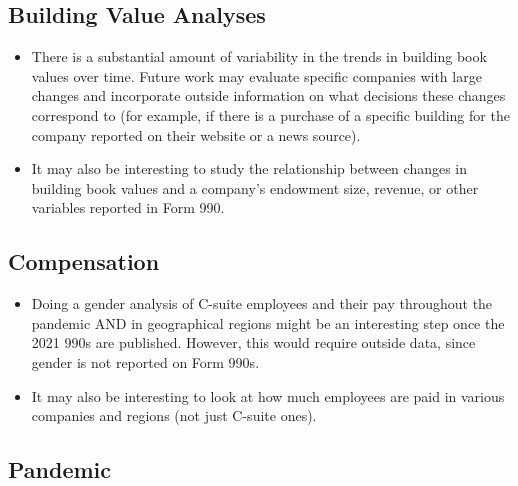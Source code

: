 \documentclass[Dance Data
Project,article,submit,moreauthors,pdftex]{mdpi}
\providecommand{\tightlist}{%
  \setlength{\itemsep}{0pt}\setlength{\parskip}{0pt}}
\begin{document}
\hypertarget{building-value-analyses}{%
\subsection{Building Value Analyses}\label{building-value-analyses}}

\begin{itemize}
\tightlist
\item
  There is a substantial amount of variability in the trends in building
  book values over time. Future work may evaluate specific companies
  with large changes and incorporate outside information on what
  decisions these changes correspond to (for example, if there is a
  purchase of a specific building for the company reported on their
  website or a news source).\\
\item
  It may also be interesting to study the relationship between changes
  in building book values and a company's endowment size, revenue, or
  other variables reported in Form 990.
\end{itemize}

\hypertarget{compensation-1}{%
\subsection{Compensation}\label{compensation-1}}

\begin{itemize}
\tightlist
\item
  Doing a gender analysis of C-suite employees and their pay throughout
  the pandemic AND in geographical regions might be an interesting step
  once the 2021 990s are published. However, this would require outside
  data, since gender is not reported on Form 990s.\\
\item
  It may also be interesting to look at how much employees are paid in
  various companies and regions (not just C-suite ones).
\end{itemize}

\hypertarget{pandemic}{%
\subsection{Pandemic}\label{pandemic}}
\end{document}
